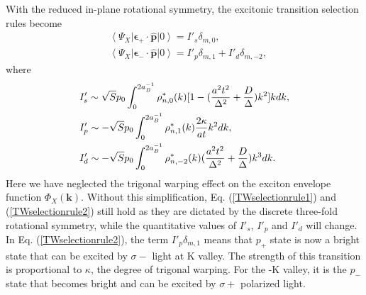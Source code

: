 \documentclass[prb,twocolumn,amsmath,amssymb,superscriptaddress,showpacs]{revtex4}
\begin{document}
With the reduced in-plane rotational symmetry, the excitonic transition selection rules become
\begin{subequations}
\label{TWselectionrules}
\begin{align}
&\left\langle \Psi_{X}\right|\mathbf{\epsilon}_{+}\cdot\hat{\mathbf{p}}\left|0\right\rangle=I'_{s}\delta_{m,0},  \label{TWselectionrule1} \\
&\left\langle \Psi_{X}\right|\mathbf{\epsilon}_{-}\cdot\hat{\mathbf{p}}\left|0\right\rangle=I'_{p}\delta_{m,1}+I'_{d}\delta_{m,-2},  \label{TWselectionrule2}
\end{align}
\end{subequations}
where
\begin{align}
&I'_{s}\sim\sqrt{S}p_0\int_{0}^{2a_{B}^{-1}}
 \rho_{n,0}^{*}(k)[1-(\frac{a^{2}t^{2}}{\Delta^{2}}+\frac{D}{\Delta})k^{2}]kdk, \notag \\
&I'_{p}\sim-\sqrt{S}p_0\int_{0}^{2a_{B}^{-1}}
 \rho_{n,1}^{*}(k)\frac{2\kappa}{at}k^{2}dk,  \notag \\
&I'_{d}\sim-\sqrt{S}p_0\int_{0}^{2a_{B}^{-1}}
 \rho_{n,-2}^{*}(k)(\frac{a^{2}t^{2}}{\Delta^{2}}+\frac{D}{\Delta})k^{3}dk.  \label{dipolestrengthTW}
\end{align}
Here we have neglected the trigonal warping effect on the exciton envelope function $\Phi_{X}(\mathbf{k})$. Without this simplification, Eq. (\ref{TWselectionrule1}) and (\ref{TWselectionrule2}) still hold as they are dictated by the discrete three-fold rotational symmetry, while the quantitative values of $I'_{s}$, $I'_{p}$ and $I'_{d}$ will change.
In Eq. (\ref{TWselectionrule2}), the term $I'_{p}\delta_{m,1}$ means that $p_{+}$ state is now a bright state that can be excited by $\sigma -$ light at K valley. The strength of this transition is proportional to $\kappa$, the degree of trigonal warping. For the -K valley, it is the $p_{-}$ state that becomes bright and can be excited by $\sigma +$ polarized light.
\end{document}
